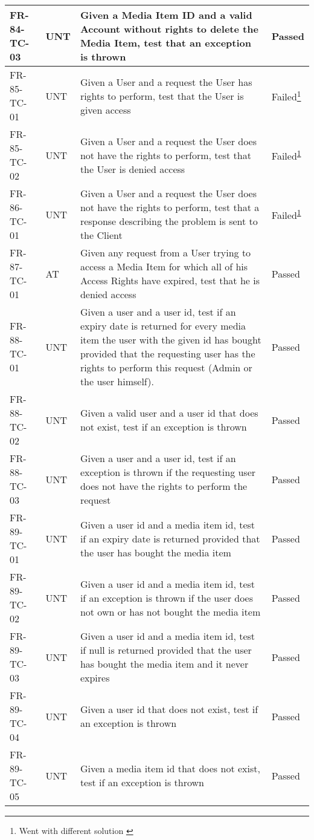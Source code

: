 \documentclass[../report.tex]{subfiles}
\newcommand{\footnoteref}[1]{\textsuperscript{\ref{#1}}}
\begin{document}
\begin{longtable}{|L{2.1cm}|L{1cm}|L{12.4cm}|L{1.4cm}|}
FR-84-TC-03&UNT&Given a Media Item ID and a valid Account without rights to delete the Media Item, test that an exception is thrown&Passed  \\ \hline
FR-85-TC-01&UNT&Given a User and a request the User has rights to perform, test that the User is given access &Failed\footnote{Went with different solution \label{note3}}  \\ \hline
FR-85-TC-02&UNT&Given a User and a request the User does not have the rights to perform, test that the User is denied access&Failed\footnoteref{note3}  \\ \hline
FR-86-TC-01&UNT&Given a User and a request the User does not have the rights to perform, test that a response describing the problem is sent to the Client&Failed\footnoteref{note3}  \\ \hline
FR-87-TC-01&AT&Given any request from a User trying to access a Media Item for which all of his Access Rights have expired, test that he is denied access&Passed  \\ \hline
FR-88-TC-01&UNT&Given a user and a user id, test if an expiry date is returned for every media item the user with the given id has bought provided that the requesting user has the rights to perform this request (Admin or the user himself).&Passed  \\ \hline
FR-88-TC-02&UNT&Given a valid user and a user id that does not exist, test if an exception is thrown&Passed  \\ \hline
FR-88-TC-03&UNT&Given a user and a user id, test if an exception is thrown if the requesting user does not have the rights to perform the request&Passed  \\ \hline
FR-89-TC-01&UNT&Given a user id and a media item id, test if an expiry date is returned provided that the user has bought the media item&Passed  \\ \hline
FR-89-TC-02&UNT&Given a user id and a media item id, test if an exception is thrown if the user does not own or has not bought the media item&Passed  \\ \hline
FR-89-TC-03&UNT&Given a user id and a media item id, test if null is returned provided that the user has bought the media item and it never expires&Passed  \\ \hline
FR-89-TC-04&UNT&Given a user id that does not exist, test if an exception is thrown&Passed  \\ \hline
FR-89-TC-05&UNT&Given a media item id that does not exist, test if an exception is thrown&Passed  \\ \hline
\end{longtable}
\end{document}
